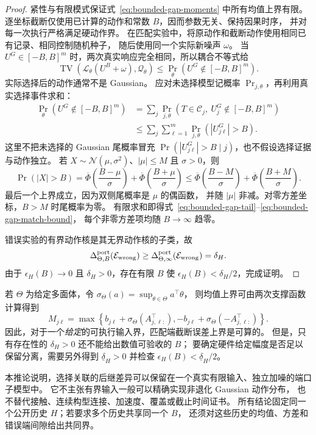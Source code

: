 \documentclass[UTF8,fontset=fandol,zihao=5,a4paper]{ctexart}
\theoremstyle{definition}
\theoremstyle{remark}\newtheorem{remark}[theorem]{说明}
\numberwithin{equation}{section}
\begin{document}
\begin{proof}
紧性与有限模式保证式~\eqref{eq:bounded-gap-moments} 中所有均值上界有限。
逐坐标截断仅使用已计算的动作和常数 $B$，因而参数无关、保持因果时序，
并对每一次执行严格满足硬动作界。
在匹配实验中，将原动作和截断动作使用相同已有记录、相同控制随机种子，
随后使用同一个实际新噪声 $\omega$。
当 $U^G\in[-B,B]^m$ 时，两次真实响应完全相同，所以耦合不等式给
\[
 \operatorname{TV}\!\left(
       \mathcal L_\theta(U^B+\omega),\mathcal Q_\theta\right)
 \le\Pr_\theta(U^G\notin[-B,B]^m).
\]
实际选择后的动作通常不是 Gaussian。
应对未选择模型记概率 $\Pr_{j,\theta}$，再利用真实选择事件求和：
\begin{align*}
 \Pr_\theta(U^G\notin[-B,B]^m)
 &=\sum_j\Pr_{j,\theta}
       (T\in\mathcal C_j,\ U_j^G\notin[-B,B]^m)\\
 &\le\sum_j\sum_{\ell=1}^{m}
              \Pr_{j,\theta}(|U_{j\ell}^G|>B).
\end{align*}
这里不把未选择的 Gaussian 尾概率冒充
$\Pr(|U_{j\ell}^G|>B\mid j)$，也不假设选择证据与动作独立。
若 $X\sim\mathcal N(\mu,\sigma^2)$、$|\mu|\le M$ 且 $\sigma>0$，则
\[
 \Pr(|X|>B)
 =\overline\Phi\!\left(\frac{B-\mu}{\sigma}\right)
  +\overline\Phi\!\left(\frac{B+\mu}{\sigma}\right)
 \le\overline\Phi\!\left(\frac{B-M}{\sigma}\right)
  +\overline\Phi\!\left(\frac{B+M}{\sigma}\right).
\]
最后一个上界成立，因为双侧尾概率是 $\mu$ 的偶函数，
并随 $|\mu|$ 非减。对零方差坐标，$B>M$ 时尾概率为零。
有限求和即得式~\eqref{eq:bounded-gap-tail}--\eqref{eq:bounded-gap-match-bound}，
每个非零方差项均随 $B\to\infty$ 趋零。

错误实验的有界动作核是其无界动作核的子类，故
\[
 \Delta_{\Theta,B}^{\rm port}(\mathcal E_{\rm wrong})
 \ge\Delta_{\Theta,\infty}^{\rm port}(\mathcal E_{\rm wrong})
 =\delta_H.
\]
由于 $\epsilon_H(B)\to0$ 且 $\delta_H>0$，存在有限 $B$ 使
$\epsilon_H(B)<\delta_H/2$，完成证明。
\end{proof}

若 $\Theta$ 为给定多面体，令
$\sigma_\Theta(a)=\sup_{\theta\in\Theta}a^\top\theta$，
则均值上界可由两次支撑函数计算得到
\[
 M_{j\ell}=\max\!\left\{
 b_{j\ell}+\sigma_\Theta(A_{j,\ell:}^{\top}),
 -b_{j\ell}+\sigma_\Theta(-A_{j,\ell:}^{\top})\right\}.
\]
因此，对于一个\emph{给定}的可执行输入界，匹配端截断误差上界是可算的。
但是，只有存在性的 $\delta_H>0$ 还不能给出数值可验收的 $B$；
要确定硬件给定幅度是否足以保留分离，需要另外得到
$\underline\delta_H>0$ 并检查 $\epsilon_H(B)<\underline\delta_H/2$。

本推论说明，选择关联的后继差异可以保留在一个真实有限输入、独立加噪的端口子模型中。
它不主张有界输入一般可以精确实现非退化 Gaussian 动作分布，
也不替代接触、连续构型连接、加速度、覆盖或截止时间证书。
所有结论固定同一个公开历史 $H$；若要求多个历史共享同一个 $B$，
还须对这些历史的均值、方差和错误端间隙给出共同界。
\end{document}
